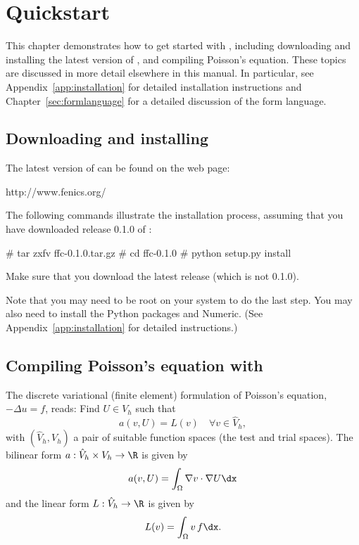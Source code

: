 \chapter{Quickstart}

This chapter demonstrates how to get started with \ffc{}, including
downloading and installing the latest version of \ffc{}, and compiling
Poisson's equation. These topics are discussed in more detail
elsewhere in this manual. In particular, see
Appendix~\ref{app:installation} for detailed installation instructions
and Chapter~\ref{sec:formlanguage} for a detailed discussion of the
form language.

\section{Downloading and installing \ffc{}}

The latest version of \ffc{} can be found on the \fenics{} web page:
\begin{code}
 http://www.fenics.org/
\end{code}
The following commands illustrate the installation process, assuming
that you have downloaded release 0.1.0 of \ffc{}:
\begin{code}
 # tar zxfv ffc-0.1.0.tar.gz
 # cd ffc-0.1.0
 # python setup.py install
\end{code}
Make sure that you download the latest release (which is not 0.1.0).

Note that you may need to be root on your system to do the last
step. You may also need to install the Python packages \fiat{} and
Numeric. (See Appendix~\ref{app:installation} for detailed instructions.)

\section{Compiling Poisson's equation with \ffc{}}

The discrete variational (finite element) formulation of Poisson's
equation, $-\Delta u = f$, reads: Find $U \in V_h$ such that
\begin{equation} \label{eq:varform}
  a(v, U) = L(v) \quad \forall v\in \hat{V}_h, 
\end{equation}
with $(\hat{V}_h, V_h)$ a pair of suitable function spaces (the test and
trial spaces). The bilinear form $a : \hat{V}_h \times V_h \rightarrow
\R$ is given by
\begin{equation}
  a(v, U) = \int_{\Omega} \nabla v \cdot \nabla U \dx
\end{equation}
and the linear form $L : \hat{V}_h \rightarrow \R$ is given by
\begin{equation}
  L(v) = \int_{\Omega} v \, f \dx.
\end{equation}


